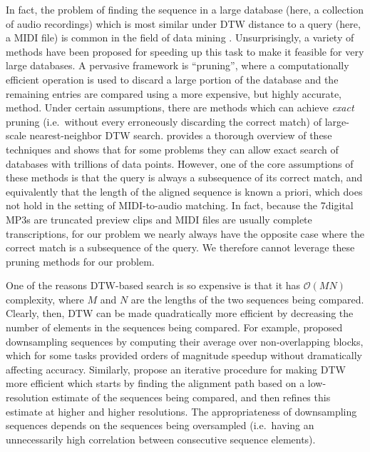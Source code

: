 In fact, the problem of finding the sequence in a large database (here, a collection of audio recordings) which is most similar under DTW distance to a query (here, a MIDI file) is common in the field of data mining \cite{berndt1994using}.
Unsurprisingly, a variety of methods have been proposed for speeding up this task to make it feasible for very large databases.
A pervasive framework is ``pruning'', where a computationally efficient operation is used to discard a large portion of the database and the remaining entries are compared using a more expensive, but highly accurate, method.
Under certain assumptions, there are methods which can achieve {\em exact} pruning (i.e.\ without every erroneously discarding the correct match) of large-scale nearest-neighbor DTW search.
\cite{rakthanmanon2012searching} provides a thorough overview of these techniques and shows that for some problems they can allow exact search of databases with trillions of data points.
However, one of the core assumptions of these methods is that the query is always a subsequence of its correct match, and equivalently that the length of the aligned sequence is known a priori, which does not hold in the setting of MIDI-to-audio matching.
In fact, because the 7digital MP3s are truncated preview clips and MIDI files are usually complete transcriptions, for our problem we nearly always have the opposite case where the correct match is a subsequence of the query.
We therefore cannot leverage these pruning methods for our problem.

One of the reasons DTW-based search is so expensive is that it has $\mathcal{O}(MN)$ complexity, where $M$ and $N$ are the lengths of the two sequences being compared.
Clearly, then, DTW can be made quadratically more efficient by decreasing the number of elements in the sequences being compared.
For example, \cite{keogh2001dimensionality,yi2000fast} proposed downsampling sequences by computing their average over non-overlapping blocks, which for some tasks provided orders of magnitude speedup without dramatically affecting accuracy.
Similarly, \cite{salvador2007toward} propose an iterative procedure for making DTW more efficient which starts by finding the alignment path based on a low-resolution estimate of the sequences being compared, and then refines this estimate at higher and higher resolutions.
The appropriateness of downsampling sequences depends on the sequences being oversampled (i.e.\ having an unnecessarily high correlation between consecutive sequence elements).

